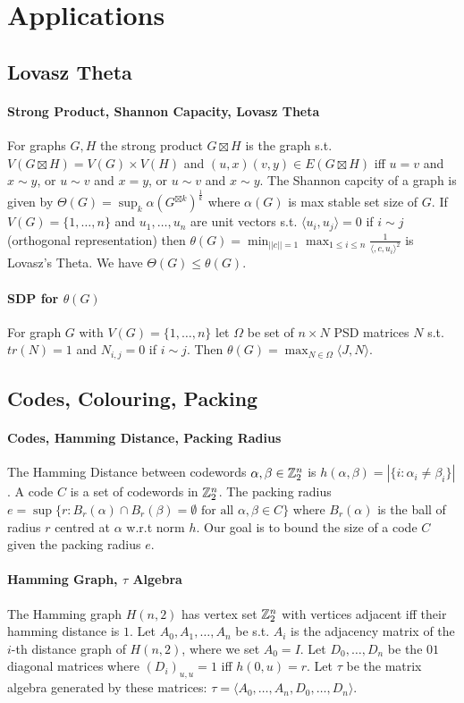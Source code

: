\documentclass[letterpaper,11pt,oneside,onecolumn]{article}
\begin{document}
\section*{Applications}
\subsection*{Lovasz Theta}
\paragraph{Strong Product, Shannon Capacity, Lovasz Theta} For graphs $G, H$ the strong product $G \boxtimes H$ is the graph s.t. $V(G\boxtimes H) = V(G) \times V(H)$ and $(u,x)(v,y) \in E(G\boxtimes H)$ iff $u=v$ and $x \sim y$, or $u\sim v$ and $x=y$, or $u\sim v$ and $x\sim y$. The Shannon capcity of a graph is given by $\Theta(G) = \sup_k \alpha(G^{\boxtimes k})^\frac{1}{k}$ where $\alpha(G)$ is max stable set size of $G$. If $V(G) = \{1,\dots, n\}$ and $u_1, \dots, u_n$ are unit vectors s.t. $\langle u_i, u_j\rangle = 0$ if $i \sim j$ (orthogonal representation) then $\theta(G) = \min_{||c|| = 1} \max_{1\leq i \leq n} \frac{1}{\langle, c,u_i\rangle^2}$ is Lovasz's Theta. We have $\Theta(G) \leq \theta (G)$.
\paragraph{SDP for $\theta(G)$} For graph $G$ with $V(G) = \{1,\dots,n\}$ let $\Omega$ be set of $n\times N$ PSD matrices $N$ s.t. $tr(N) = 1$ and $N_{i,j} = 0$ if $i\sim j$. Then $\theta(G) = \max_{N \in \Omega} \langle J, N\rangle$.
\subsection*{Codes, Colouring, Packing}
\paragraph{Codes, Hamming Distance, Packing Radius} The Hamming Distance between codewords $\alpha,\beta \in \mathbb{Z}^n_2$ is $h(\alpha,\beta) = |\{i:\alpha_i \neq \beta_i \}|$. A code $C$ is a set of codewords in $\mathbb{Z}^n_2$. The packing radius $e = \sup \{ r: B_r(\alpha) \cap B_r(\beta) = \emptyset \text{ for all } \alpha,\beta \in C\}$ where $B_r(\alpha)$ is the ball of radius $r$ centred at $\alpha$ w.r.t norm $h$. Our goal is to bound the size of a code $C$ given the packing radius $e$.
\paragraph{Hamming Graph, $\tau$ Algebra} The Hamming graph $H(n,2)$ has vertex set $\mathbb{Z}^n_2$ with vertices adjacent iff their hamming distance is $1$. Let $A_0, A_1, \dots, A_n$ be s.t. $A_i$ is the adjacency matrix of the $i$-th distance graph of $H(n,2)$, where we set $A_0 = I$. Let $D_0,\dots, D_n$ be the $0$$1$ diagonal matrices where $(D_i)_{u,u}= 1$ iff $h(0,u) = r$. Let $\tau$ be the matrix algebra generated by these matrices: $\tau = \langle A_0, \dots, A_n, D_0, \dots, D_n \rangle$.
\end{document}
